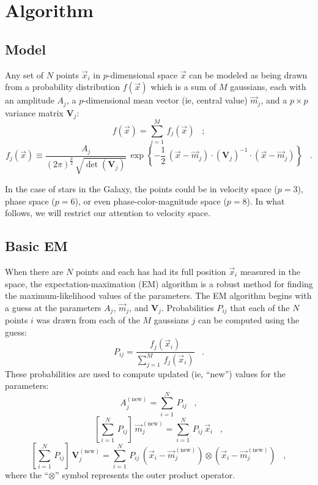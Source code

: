 \documentclass{article}
\begin{document}
\section{Algorithm}

\subsection{Model}

Any set of $N$ points $\vec{x}_i$ in $p$-dimensional space $\vec{x}$
can be modeled as being drawn from a probability distribution
$f(\vec{x})$ which is a sum of $M$ gaussians, each with an amplitude
$A_j$, a $p$-dimensional mean vector (ie, central value) $\vec{m}_j$,
and a $p\times p$ variance matrix $\mathbf{V}_j$:
\begin{equation}
f(\vec{x})= \sum_{j=1}^M\,f_j(\vec{x}) \;\;\; ;
\end{equation}
\begin{equation}
f_j(\vec{x})\equiv
  \frac{A_j}{(2\pi)^\frac{p}{2}\,\sqrt{\det(\mathbf{V}_j)}}\,
  \exp\left\{-\frac{1}{2}\,
  (\vec{x}-\vec{m}_j)\cdot(\mathbf{V}_j)^{-1}\cdot(\vec{x}-\vec{m}_j)\right\}
  \;\;\; .
\end{equation}

In the case of stars in the Galaxy, the points could be in velocity
space ($p=3$), phase space ($p=6$), or even phase-color-magnitude
space ($p=8$).  In what follows, we will restrict our attention to
velocity space.

\subsection{Basic EM}

When there are $N$ points and each has had its full position
$\vec{x}_i$ measured in the space, the expectation-maximation (EM)
algorithm is a robust method for finding the maximum-likelihood values
of the parameters.  The EM algorithm begins with a guess at the
parameters $A_j$, $\vec{m}_j$, and $\mathbf{V}_j$.  Probabilities
$P_{ij}$ that each of the $N$ points $i$ was drawn from each of the
$M$ gaussians $j$ can be computed using the guess:
\begin{equation}
P_{ij}= \frac{f_j(\vec{x}_i)}{\sum_{j=1}^M\,f_j(\vec{x}_i)} \;\;\; .
\end{equation}
These probabilities are used to compute updated (ie, ``new'') values
for the parameters:
\begin{equation}
A_j^\mathrm{(new)}= \sum_{i=1}^N\,P_{ij} \;\;\; ,
\end{equation}
\begin{equation}
\left[\sum_{i=1}^N\,P_{ij}\right]\,\vec{m}_j^\mathrm{(new)}= 
  \sum_{i=1}^N\,P_{ij}\,\vec{x}_i \;\;\;,
\end{equation}
\begin{equation}
\left[\sum_{i=1}^N\,P_{ij}\right]\,\mathbf{V}_j^\mathrm{(new)}= 
  \sum_{i=1}^N\,P_{ij}\,(\vec{x}_i-\vec{m}_j^\mathrm{(new)})\otimes
  (\vec{x}_i-\vec{m}_j^\mathrm{(new)})
  \;\;\; ,
\end{equation}
where the ``$\otimes$'' symbol represents the outer product operator.
\end{document}
